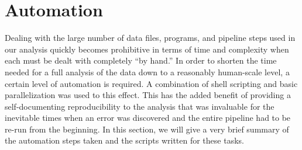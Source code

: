 
%
%

\section{Automation}
\label{sec:automation}



Dealing with the large number of data files, programs, and pipeline steps used in our analysis quickly becomes prohibitive in terms of time and complexity when each must be dealt with completely ``by hand.''  In order to shorten the time needed for a full analysis of the data down to a reasonably human-scale level, a certain level of automation is required.  A combination of shell scripting and basic parallelization was used to this effect.  This has the added benefit of providing a self-documenting reproducibility to the analysis that was invaluable for the inevitable times when an error was discovered and the entire pipeline had to be re-run from the beginning.  In this section, we will give a very brief summary of the automation steps taken and the scripts written for these tasks.




